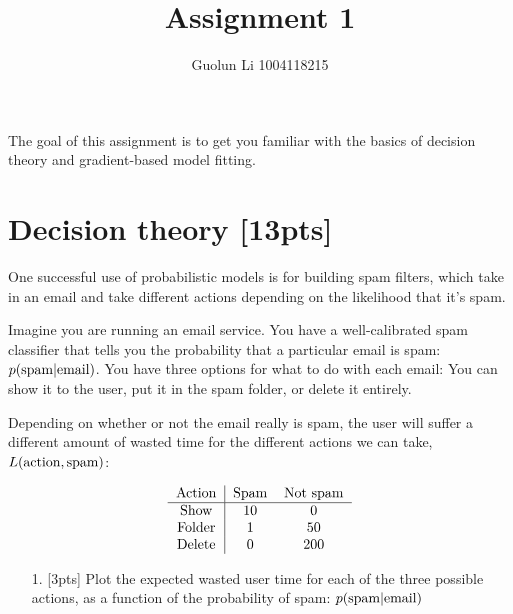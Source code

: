\documentclass[12pt,a4paper]{article}
\title{ Assignment 1 }
\author{ Guolun Li 1004118215 }
\begin{document}
\maketitle

The goal of this assignment is to get you familiar with the basics of decision theory and gradient-based model fitting.

\section{Decision theory [13pts]}
One successful use of probabilistic models is for building spam filters, which take in an email and take different actions depending on the likelihood that it's spam.

Imagine you are running an email service. You have a well-calibrated spam classifier that tells you the probability that a particular email is spam: $p(\textnormal{spam}|\textnormal{email})$. You have three options for what to do with each email: You can show it to the user, put it in the spam folder, or delete it entirely.

Depending on whether or not the email really is spam, the user will suffer a different amount of wasted time for the different actions we can take, $L(\textnormal{action}, \textnormal{spam})$:

\[
\begin{tabular}{c|cc}
Action & Spam & Not spam \\ \hline
Show   & 10 & 0 \\
Folder & 1  & 50 \\
Delete & 0  & 200
\end{tabular}
\]
\begin{itemize}
\item[1. ] [3pts] Plot the expected wasted user time for each of the three possible actions, as a function of the probability of spam: $p(\textnormal{spam}|\textnormal{email})$

\end{itemize}
\end{document}
